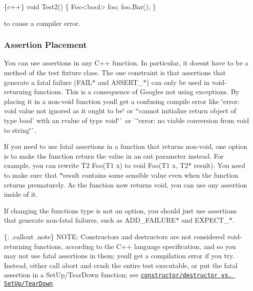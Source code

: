 \begin{DoxyCode}
\{c++\}
void Test2() \{ Foo<bool> foo; foo.Bar(); \}
\end{DoxyCode}


to cause a compiler error.

\subsubsection*{Assertion Placement}

You can use assertions in any C++ function. In particular, it doesn\textquotesingle{}t have to be a method of the test fixture class. The one constraint is that assertions that generate a fatal failure ({\ttfamily F\+A\+I\+L$\ast$} and {\ttfamily A\+S\+S\+E\+R\+T\+\_\+$\ast$}) can only be used in void-\/returning functions. This is a consequence of Google\textquotesingle{}s not using exceptions. By placing it in a non-\/void function you\textquotesingle{}ll get a confusing compile error like {\ttfamily \char`\"{}error\+: void value not ignored as it ought to be\char`\"{}} or `\char`\"{}cannot
initialize return object of type \textquotesingle{}bool' with an rvalue of type \textquotesingle{}void\textquotesingle{}\char`\"{}\`{} or \`{}\char`\"{}error\+: no viable conversion from \textquotesingle{}void\textquotesingle{} to \textquotesingle{}string\textquotesingle{}\char`\"{}\`{}.

If you need to use fatal assertions in a function that returns non-\/void, one option is to make the function return the value in an out parameter instead. For example, you can rewrite {\ttfamily T2 Foo(\+T1 x)} to {\ttfamily void Foo(\+T1 x, T2$\ast$ result)}. You need to make sure that {\ttfamily $\ast$result} contains some sensible value even when the function returns prematurely. As the function now returns {\ttfamily void}, you can use any assertion inside of it.

If changing the function\textquotesingle{}s type is not an option, you should just use assertions that generate non-\/fatal failures, such as {\ttfamily A\+D\+D\+\_\+\+F\+A\+I\+L\+U\+R\+E$\ast$} and {\ttfamily E\+X\+P\+E\+C\+T\+\_\+$\ast$}.

\{\+: .callout .note\} N\+O\+TE\+: Constructors and destructors are not considered void-\/returning functions, according to the C++ language specification, and so you may not use fatal assertions in them; you\textquotesingle{}ll get a compilation error if you try. Instead, either call {\ttfamily abort} and crash the entire test executable, or put the fatal assertion in a {\ttfamily Set\+Up}/{\ttfamily Tear\+Down} function; see \href{faq.md#CtorVsSetUp}{\tt constructor/destructor vs. {\ttfamily Set\+Up}/{\ttfamily Tear\+Down}}

